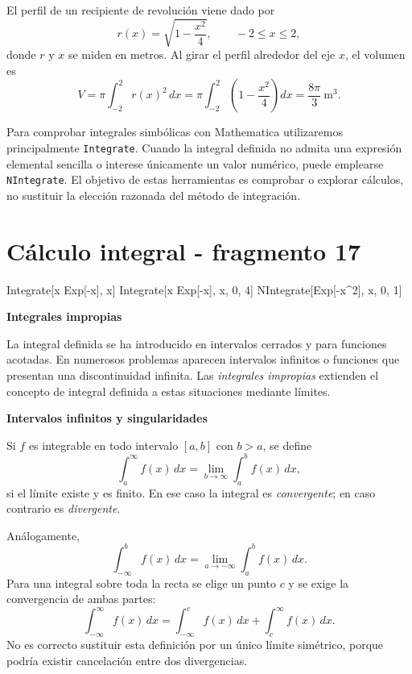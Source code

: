 \begin{example}
El perfil de un recipiente de revolución viene dado por
\[
r(x)=\sqrt{1-\frac{x^2}{4}},
\qquad -2\leq x\leq2,
\]
donde $r$ y $x$ se miden en metros. Al girar el perfil alrededor del eje $x$, el volumen es
\[
V=\pi\int_{-2}^2r(x)^2\,dx
=
\pi\int_{-2}^2\left(1-\frac{x^2}{4}\right)dx
=
\frac{8\pi}{3}\ \mathrm{m}^3.
\]
\end{example}

Para comprobar integrales simbólicas con Mathematica utilizaremos principalmente \texttt{Integrate}. Cuando la integral definida no admita una expresión elemental sencilla o interese únicamente un valor numérico, puede emplearse \texttt{NIntegrate}. El objetivo de estas herramientas es comprobar o explorar cálculos, no sustituir la elección razonada del método de integración.


\section{Cálculo integral - fragmento 17}
\begin{mathematicacode}
Integrate[x Exp[-x], x]
Integrate[x Exp[-x], {x, 0, 4}]
NIntegrate[Exp[-x^2], {x, 0, 1}]
\end{mathematicacode}

\textbf{Integrales impropias}

La integral definida se ha introducido en intervalos cerrados y para funciones acotadas. En numerosos problemas aparecen intervalos infinitos o funciones que presentan una discontinuidad infinita. Las \emph{integrales impropias} extienden el concepto de integral definida a estas situaciones mediante límites.

\textbf{Intervalos infinitos y singularidades}

\begin{definition}
Si $f$ es integrable en todo intervalo $[a,b]$ con $b>a$, se define
\[
\int_a^{\infty}f(x)\,dx
=
\lim_{b\to\infty}\int_a^b f(x)\,dx,
\]
si el límite existe y es finito. En ese caso la integral es \emph{convergente}; en caso contrario es \emph{divergente}.
\end{definition}

Análogamente,
\[
\int_{-\infty}^b f(x)\,dx
=
\lim_{a\to-\infty}\int_a^b f(x)\,dx.
\]
Para una integral sobre toda la recta se elige un punto $c$ y se exige la convergencia de ambas partes:
\[
\int_{-\infty}^{\infty}f(x)\,dx
=
\int_{-\infty}^{c}f(x)\,dx+
\int_c^{\infty}f(x)\,dx.
\]
No es correcto sustituir esta definición por un único límite simétrico, porque podría existir cancelación entre dos divergencias.

